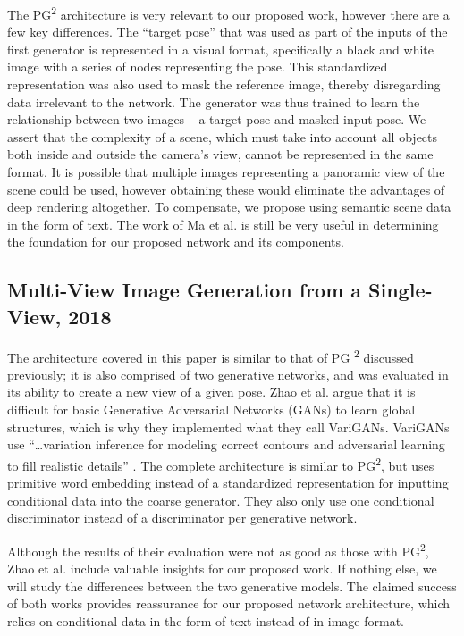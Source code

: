 \documentclass{article}
\begin{document}
The PG\textsuperscript{2} architecture is very relevant to our proposed work,
however there are a few key differences. The ``target pose'' that was used as 
part of the inputs of the first generator is represented in a visual format,
specifically a black and white image with a series of nodes representing the
pose. This standardized representation was also used to mask the reference image,
thereby disregarding data irrelevant to the network.
The generator was thus trained to learn the relationship between two
images -- a target pose and masked input pose. We assert that the complexity of a
scene, which must take into account all objects both
inside and outside the camera's view, cannot be represented in the same format.
It is possible that multiple images representing a panoramic view of the scene
could be used, however obtaining these would eliminate the advantages of deep
rendering altogether. To compensate, we propose using semantic scene data in the
form of text. The work of Ma et al. is still be very useful in determining the
foundation for our proposed network and its components.

\subsection*{Multi-View Image Generation from a Single-View, 2018}
\nocite{multi_view}
The architecture covered in this paper is similar to that of PG
\textsuperscript{2}
discussed previously; it is also comprised of two generative
networks, and was evaluated in its ability to create a new view of a given pose.
Zhao et al. argue that it is difficult for basic Generative Adversarial Networks
(GANs) to learn global structures, which is why they implemented what they
call VariGANs. VariGANs use
``\dots variation inference for modeling correct contours and adversarial
learning to fill realistic details'' \cite{multi_view}. The complete architecture
is similar to PG\textsuperscript{2}, but uses primitive word embedding instead of
a standardized representation for inputting conditional data into the coarse
generator. They also only use one conditional discriminator instead of a 
discriminator per generative network.

Although the results of their evaluation were not as good as those with
PG\textsuperscript{2}, Zhao et al. include valuable insights for
our proposed work. If nothing else, we will study the differences between the two
generative models. The claimed success of both works provides reassurance for our
proposed network architecture, which relies on conditional data in the form of
text instead of in image format.
\end{document}
